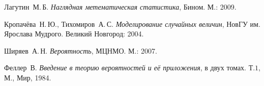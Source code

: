 \begin{thebibliography}{0}
	 Лагутин~М.\,Б.
	\emph{Наглядная метематическая статистика}, Бином. М.: 2009.
	
	 Кропачёва~Н.\,Ю., Тихомиров~А.\,С.
	\emph{Моделирование случайных величин}, НовГУ им. Ярослава
     Мудрого. Великий Новгород: 2004.

	 Ширяев~А.\,Н.
	\emph{Вероятность}, МЦНМО. М.: 2007.

	 Феллер~В.
	\emph{Введение в теорию вероятностей и её приложения}, в двух
	 томах. Т.\( 1 \), М., Мир, 1984.
\end{thebibliography}